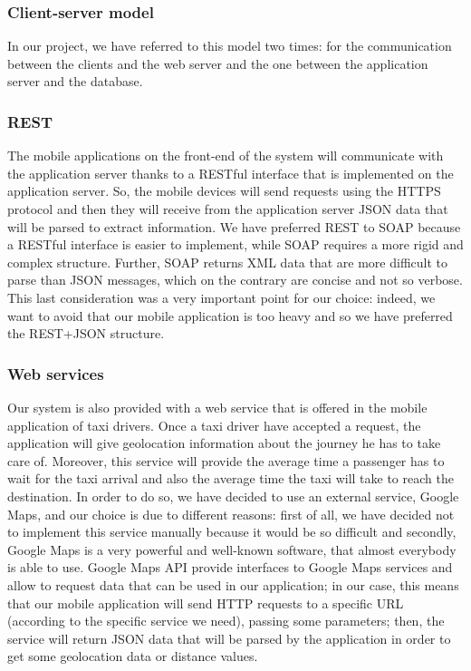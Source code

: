 \subsubsection{Client-server model}

    In our project, we have referred to this model two times: for the communication between the clients and the web server and the one between the application server and the database.
    
\subsubsection{REST}
    
    The mobile applications on the front-end of the system will communicate with the application server thanks to a RESTful interface that is implemented on the application server. So, the mobile devices will send requests using the HTTPS protocol and then they will receive from the application server JSON data that will be parsed to extract information.
    \newline
    We have preferred REST to SOAP because a RESTful interface is easier to implement, while SOAP requires a more rigid and complex structure. Further, SOAP returns XML data that are more difficult to parse than JSON messages, which on the contrary are concise and not so verbose. This last consideration was a very important point for our choice: indeed, we want to avoid that our mobile application is too heavy and so we have preferred the REST+JSON structure.
    
\subsubsection{Web services}
    
    Our system is also provided with a web service that is offered in the mobile application of taxi drivers. Once a taxi driver have accepted a request, the application will give geolocation information about the journey he has to take care of. Moreover, this service will provide the average time a passenger has to wait for the taxi arrival and also the average time the taxi will take to reach the destination.
    \newline
    In order to do so, we have decided to use an external service, Google Maps, and our choice is due to different reasons: first of all, we have decided not to implement this service manually because it would be so difficult and secondly, Google Maps is a very powerful and well-known software, that almost everybody is able to use.
    \newline
    Google Maps API provide interfaces to Google Maps services and allow to request data that can be used in our application; in our case, this means that our mobile application will send HTTP requests to a specific URL (according to the specific service we need), passing some parameters; then, the service will return JSON data that will be parsed by the application in order to get some geolocation data or distance values.